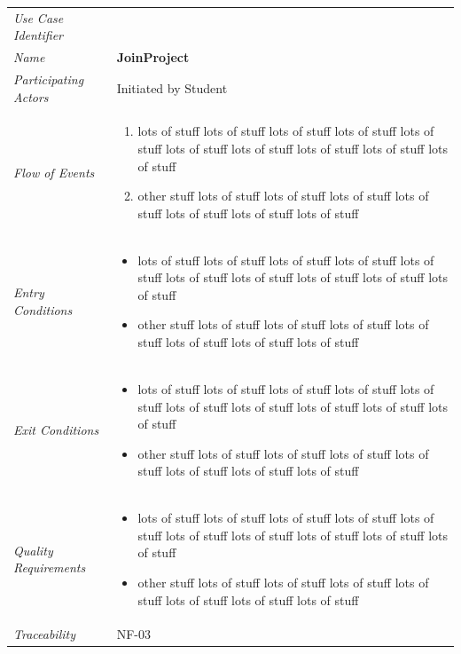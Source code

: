 \documentclass[12pt,letterpaper]{article}
\begin{document}
\begin{center}
	\begin{tabu} to 
		\toprule
		Use Case Identifier & \joinproject{} \\
		Name & {\bf JoinProject} \\
		Participating Actors & Initiated by Student \\
		Flow of Events & 
	    \begin{enumerate}[topsep=-1em]
		    \item lots of stuff lots of stuff lots of stuff lots of stuff lots of stuff lots of stuff lots of stuff lots of stuff lots of stuff lots of stuff
		    \item other stuff lots of stuff lots of stuff lots of stuff lots of stuff lots of stuff lots of stuff lots of stuff
		\end{enumerate} \\

		Entry Conditions &
		\begin{itemize}[topsep=-1em]
		    \item lots of stuff lots of stuff lots of stuff lots of stuff lots of stuff lots of stuff lots of stuff lots of stuff lots of stuff lots of stuff
		    \item other stuff lots of stuff lots of stuff lots of stuff lots of stuff lots of stuff lots of stuff lots of stuff
        \end{itemize} \\

		Exit Conditions &
		\begin{itemize}[topsep=-1em]
		    \item lots of stuff lots of stuff lots of stuff lots of stuff lots of stuff lots of stuff lots of stuff lots of stuff lots of stuff lots of stuff
		    \item other stuff lots of stuff lots of stuff lots of stuff lots of stuff lots of stuff lots of stuff lots of stuff
        \end{itemize} \\

		Quality Requirements &
		\begin{itemize}[topsep=-1em]
		    \item lots of stuff lots of stuff lots of stuff lots of stuff lots of stuff lots of stuff lots of stuff lots of stuff lots of stuff lots of stuff
		    \item other stuff lots of stuff lots of stuff lots of stuff lots of stuff lots of stuff lots of stuff lots of stuff
        \end{itemize} \\

		Traceability & NF-03 \\
		\toprule
	\end{tabu}
\end{center}
\end{document}
